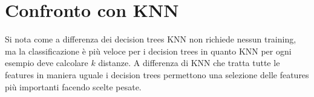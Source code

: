 \section{Confronto con KNN}
Si nota come a differenza dei decision trees KNN non richiede nessun training, ma la classificazione \`e pi\`u veloce per i decision trees in quanto KNN per ogni esempio deve calcolare $k$ distanze.
A differenza di KNN che tratta tutte le features in maniera uguale i decision trees permettono una selezione delle features pi\`u importanti facendo scelte pesate.

